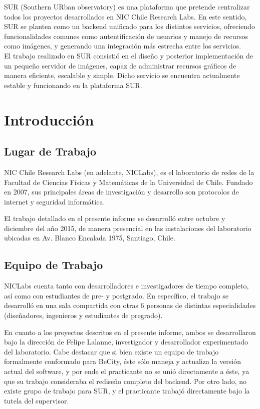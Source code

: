 \documentclass[11pt,letterpaper]{article}
\begin{document}
SUR (Southern URban observatory) es una plataforma que pretende centralizar todos los proyectos desarrollados en NIC Chile Research Labs. En este sentido, SUR se plantea como un backend unificado para los distintos servicios, ofreciendo funcionalidades comunes como autentificación de usuarios y manejo de recursos como imágenes, y generando una integración más estrecha entre los servicios.\\

El trabajo realizado en SUR consistió en el diseño y posterior implementación de un pequeño servidor de imágenes, capaz de administrar recursos gráficos de manera eficiente, escalable y simple. Dicho servicio se encuentra actualmente estable y funcionando en la plataforma SUR.
\newpage
\section{Introducción}
\subsection{Lugar de Trabajo}

NIC Chile Research Labs (en adelante, NICLabs)\cite{niclabs}, es el laboratorio de redes de la Facultad de Ciencias Físicas y Matemáticas de la Universidad de Chile. Fundado en 2007, sus principales áreas de investigación y desarrollo son protocolos de internet y seguridad informática.

El trabajo detallado en el presente informe se desarrolló entre octubre y diciembre del año 2015, de manera presencial en las instalaciones del laboratorio ubicadas en Av. Blanco Encalada 1975, Santiago, Chile.

\subsection{Equipo de Trabajo}


NICLabs cuenta tanto con desarrolladores e investigadores de tiempo completo, así como con estudiantes de pre- y postgrado. En específico, el trabajo se desarrolló en una sala compartida con otras 6 personas de distintas especialidades (diseñadores, ingenieros y estudiantes de pregrado).

En cuanto a los proyectos descritos en el presente informe, ambos se desarrollaron bajo la dirección de Felipe Lalanne\cite{lalanne}, investigador y desarrollador experimentado del laboratorio. Cabe destacar que si bien existe un equipo de trabajo formalmente conformado para BeCity, éste sólo maneja y actualiza la versión actual del software, y por ende el practicante no se unió directamente a éste, ya que su trabajo consideraba el rediseño completo del backend.
Por otro lado, no existe grupo de trabajo para SUR, y el practicante trabajó directamente bajo la tutela del supervisor.
\newpage
\end{document}
